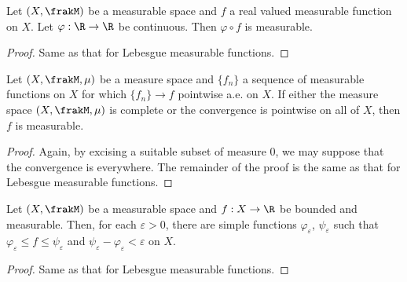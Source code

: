 \begin{proposition}
    Let $(X,\frakM)$ be a measurable space and $f$ a real valued measurable function on $X$. Let $\varphi:\R\to\R$ be continuous. Then $\varphi\circ f$ is measurable.
\end{proposition}
\begin{proof}
    Same as that for Lebesgue measurable functions.
\end{proof}

\begin{theorem}
    Let $(X,\frakM,\mu)$ be a measure space and $\{f_n\}$ a sequence of measurable functions on $X$ for which $\{f_n\}\to f$ pointwise a.e. on $X$. If either the measure space $(X,\frakM,\mu)$ is complete or the convergence is pointwise on all of $X$, then $f$ is measurable.
\end{theorem}
\begin{proof}
    Again, by excising a suitable subset of measure 0, we may suppose that the convergence is everywhere. The remainder of the proof is the same as that for Lebesgue measurable functions.
\end{proof}

\begin{lemma}
    Let $(X,\frakM)$ be a measurable space and $f: X\to\R$ be bounded and measurable. Then, for each $\varepsilon > 0$, there are simple functions $\varphi_\varepsilon$, $\psi_\varepsilon$ such that $\varphi_\varepsilon\le f\le\psi_\varepsilon$ and $\psi_\varepsilon - \varphi_\varepsilon < \varepsilon$ on $X$.
\end{lemma}
\begin{proof}
    Same as that for Lebesgue measurable functions.
\end{proof}

